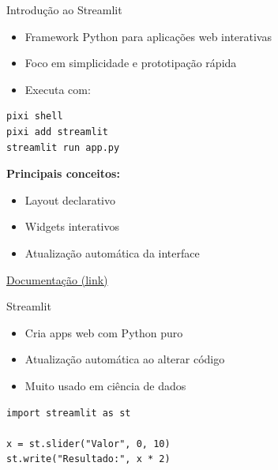 \documentclass{beamer}
\begin{document}
\begin{frame}[fragile]{Introdução ao Streamlit}
    \begin{itemize}
        \item Framework Python para aplicações web interativas
        \item Foco em simplicidade e prototipação rápida
        \item Executa com:
    \end{itemize}
    
\begin{verbatim}
pixi shell
pixi add streamlit 
streamlit run app.py
\end{verbatim}

    \vspace{0.3cm}
    
    \textbf{Principais conceitos:}
    \begin{itemize}
        \item Layout declarativo
        \item Widgets interativos
        \item Atualização automática da interface
    \end{itemize}
    \href{https://streamlit.io/}{Documentação (link)}
\end{frame}

\begin{frame}[fragile]{Streamlit}
\begin{itemize}
    \item Cria apps web com Python puro
    \item Atualização automática ao alterar código
    \item Muito usado em ciência de dados
\end{itemize}
\vspace{0.3cm}
\begin{verbatim}
import streamlit as st

x = st.slider("Valor", 0, 10)
st.write("Resultado:", x * 2)
\end{verbatim}

\end{frame}
\end{document}

